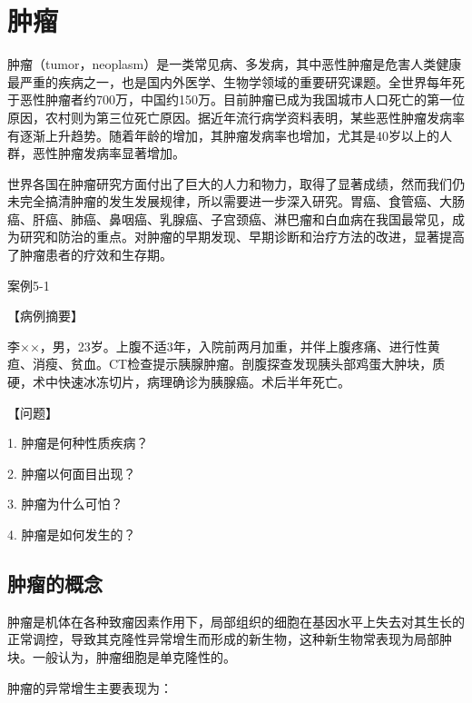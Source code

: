 \chapter{肿瘤}


肿瘤（tumor，neoplasm）是一类常见病、多发病，其中恶性肿瘤是危害人类健康最严重的疾病之一，也是国内外医学、生物学领域的重要研究课题。全世界每年死于恶性肿瘤者约700万，中国约150万。目前肿瘤已成为我国城市人口死亡的第一位原因，农村则为第三位死亡原因。据近年流行病学资料表明，某些恶性肿瘤发病率有逐渐上升趋势。随着年龄的增加，其肿瘤发病率也增加，尤其是40岁以上的人群，恶性肿瘤发病率显著增加。

世界各国在肿瘤研究方面付出了巨大的人力和物力，取得了显著成绩，然而我们仍未完全搞清肿瘤的发生发展规律，所以需要进一步深入研究。胃癌、食管癌、大肠癌、肝癌、肺癌、鼻咽癌、乳腺癌、子宫颈癌、淋巴瘤和白血病在我国最常见，成为研究和防治的重点。对肿瘤的早期发现、早期诊断和治疗方法的改进，显著提高了肿瘤患者的疗效和生存期。

\begin{framed}
  {案例5-1}

  {【病例摘要】}

  李××，男，23岁。上腹不适3年，入院前两月加重，并伴上腹疼痛、进行性黄疸、消瘦、贫血。CT检查提示胰腺肿瘤。剖腹探查发现胰头部鸡蛋大肿块，质硬，术中快速冰冻切片，病理确诊为胰腺癌。术后半年死亡。

  {【问题】}

  1. 肿瘤是何种性质疾病？

  2. 肿瘤以何面目出现？

  3. 肿瘤为什么可怕？

  4. 肿瘤是如何发生的？
\end{framed}
\section{肿瘤的概念}

肿瘤是机体在各种致瘤因素作用下，局部组织的细胞在基因水平上失去对其生长的正常调控，导致其克隆性异常增生而形成的新生物，这种新生物常表现为局部肿块。一般认为，肿瘤细胞是单克隆性的。

肿瘤的异常增生主要表现为：


